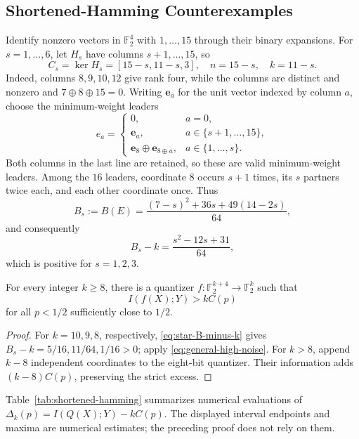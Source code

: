 \subsection{Shortened-Hamming Counterexamples}
\label{subsec:shortened-hamming}

Identify nonzero vectors in \(\mathbb F_2^4\) with \(1,\ldots,15\)
through their binary expansions. For \(s=1,\ldots,6\), let \(H_s\)
have columns \(s+1,\ldots,15\), so
\[
C_s=\ker H_s=[15-s,11-s,3],\quad n=15-s,\quad k=11-s.
\]
Indeed, columns \(8,9,10,12\) give rank four, while the columns
are distinct and nonzero and \(7\oplus8\oplus15=0\).
Writing \(\mathbf e_a\) for the unit vector indexed by column \(a\),
choose the minimum-weight leaders
\begin{equation}
 e_a=
 \begin{cases}
 0, & a=0,\\
 \mathbf e_a, & a\in\{s+1,\ldots,15\},\\
 \mathbf e_8\oplus\mathbf e_{8\oplus a}, & a\in\{1,\ldots,s\}.
 \end{cases}
 \label{eq:star-leaders}
\end{equation}
Both columns in the last line are retained, so these are valid
minimum-weight leaders. Among the \(16\) leaders, coordinate \(8\)
occurs \(s+1\) times, its \(s\) partners twice each, and each
other coordinate once. Thus
\[
 B_s:=B(E)=\frac{(7-s)^2+36s+49(14-2s)}{64},
\]
and consequently
\begin{equation}
 B_s-k=\frac{s^2-12s+31}{64},
 \label{eq:star-B-minus-k}
\end{equation}
which is positive for \(s=1,2,3\).

\begin{proposition}
\label{prop:k8-k10-counterexamples}
\label{cor:failure-all-k-ge-8}
For every integer \(k\geq8\), there is a quantizer
\(f:\mathbb F_2^{k+4}\to\mathbb F_2^k\) such that
\[
 I(f(X);Y)>kC(p)
\]
for all \(p<1/2\) sufficiently close to \(1/2\).
\end{proposition}
\begin{proof}
For \(k=10,9,8\), respectively, \eqref{eq:star-B-minus-k} gives
\(B_s-k=5/16,11/64,1/16>0\); apply
\eqref{eq:general-high-noise}.
For \(k>8\), append \(k-8\) independent coordinates to the
eight-bit quantizer. Their information adds \((k-8)C(p)\),
preserving the strict excess.
\end{proof}

Table~\ref{tab:shortened-hamming} summarizes numerical evaluations
of \(\Delta_k(p)=I(Q(X);Y)-kC(p)\). The displayed interval
endpoints and maxima are numerical estimates; the preceding proof
does not rely on them.

